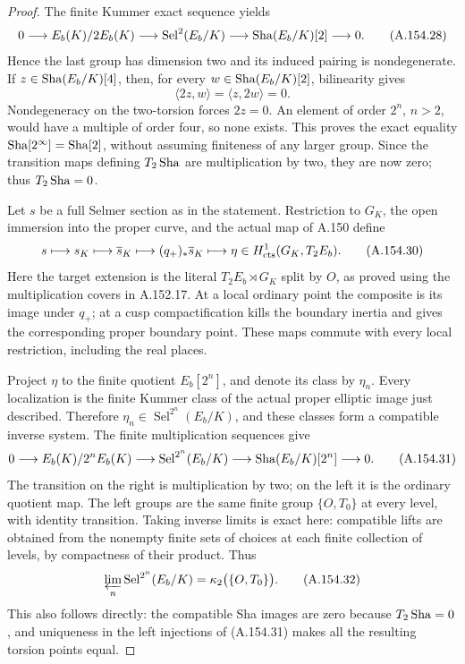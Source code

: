 \begin{proof}
The finite Kummer exact sequence yields
\[
 0\longrightarrow E_b(K)/2E_b(K)
 \longrightarrow\operatorname{Sel}^{2}(E_b/K)
 \longrightarrow\operatorname{Sha}(E_b/K)[2]\longrightarrow0.
\tag{A.154.28}
\]
Hence the last group has dimension two and its induced
pairing is nondegenerate.  If \(z\in\operatorname{Sha}(E_b/K)[4]\),
then, for every \(w\in\operatorname{Sha}(E_b/K)[2]\), bilinearity gives
\[
                   \langle2z,w\rangle
                              =\langle z,2w\rangle=0.
\tag{A.154.29}
\]
Nondegeneracy on the two-torsion forces \(2z=0\).
An element of order \(2^n\), \(n>2\), would have a
multiple of order four, so none exists.  This proves
the exact equality \(\operatorname{Sha}[2^\infty]=\operatorname{Sha}[2]\), without
assuming finiteness of any larger group.  Since the
transition maps defining \(T_2\operatorname{Sha}\) are multiplication
by two, they are now zero; thus \(T_2\operatorname{Sha}=0\).

Let \(s\) be a full Selmer section as in the statement.
Restriction to \(G_K\), the open immersion into the proper curve, and
the actual map of A.150 define
\[
 s\longmapsto s_K\longmapsto\overline s_K
 \longmapsto(q_+)_*\overline s_K
 \longmapsto\eta\in H^1_{\rm cts}(G_K,T_2E_b).
\tag{A.154.30}
\]
Here the target extension is the literal
\(T_2E_b\rtimes G_K\) split by \(O\), as proved using
the multiplication covers in A.152.17.
At a local ordinary point the composite is its image
under \(q_+\); at a cusp compactification kills the
boundary inertia and gives the corresponding proper
boundary point.  These maps commute with every local
restriction, including the real places.

Project \(\eta\) to the finite quotient \(E_b[2^n]\),
and denote its class by \(\eta_n\).
Every localization is the finite Kummer class of the
actual proper elliptic image just described.  Therefore
\(\eta_n\in\operatorname{Sel}^{2^n}(E_b/K)\), and these
classes form a compatible inverse system.  The finite
multiplication sequences give
\[
 0\longrightarrow E_b(K)/2^nE_b(K)
 \longrightarrow\operatorname{Sel}^{2^n}(E_b/K)
 \longrightarrow\operatorname{Sha}(E_b/K)[2^n]\longrightarrow0.
\tag{A.154.31}
\]
The transition on the right is multiplication by two;
on the left it is the ordinary quotient map.
The left groups are the same finite group \(\{O,T_0\}\)
at every level, with identity transition.  Taking
inverse limits is exact here: compatible lifts are
obtained from the nonempty finite sets of choices at
each finite collection of levels, by compactness of
their product.  Thus
\[
 \varprojlim_n\operatorname{Sel}^{2^n}(E_b/K)
                      =\kappa_2\bigl(\{O,T_0\}\bigr).
\tag{A.154.32}
\]
This also follows directly: the compatible Sha images
are zero because \(T_2\operatorname{Sha}=0\), and uniqueness in the
left injections of (A.154.31) makes all the resulting
torsion points equal.


\end{proof}
